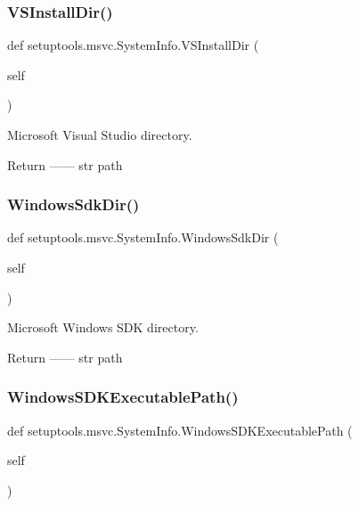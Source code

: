 \subsubsection{\texorpdfstring{V\+S\+Install\+Dir()}{VSInstallDir()}}
{\footnotesize\ttfamily def setuptools.\+msvc.\+System\+Info.\+V\+S\+Install\+Dir (\begin{DoxyParamCaption}\item[{}]{self }\end{DoxyParamCaption})}

\begin{DoxyVerb}Microsoft Visual Studio directory.

Return
------
str
    path
\end{DoxyVerb}
 \mbox{\label{classsetuptools_1_1msvc_1_1SystemInfo_a2aaf265345e0e8438533c8a325b57e7f}} 
\subsubsection{\texorpdfstring{Windows\+Sdk\+Dir()}{WindowsSdkDir()}}
{\footnotesize\ttfamily def setuptools.\+msvc.\+System\+Info.\+Windows\+Sdk\+Dir (\begin{DoxyParamCaption}\item[{}]{self }\end{DoxyParamCaption})}

\begin{DoxyVerb}Microsoft Windows SDK directory.

Return
------
str
    path
\end{DoxyVerb}
 \mbox{\label{classsetuptools_1_1msvc_1_1SystemInfo_a7a8b2e20afb2590c88e26c002bd8a365}} 
\subsubsection{\texorpdfstring{Windows\+S\+D\+K\+Executable\+Path()}{WindowsSDKExecutablePath()}}
{\footnotesize\ttfamily def setuptools.\+msvc.\+System\+Info.\+Windows\+S\+D\+K\+Executable\+Path (\begin{DoxyParamCaption}\item[{}]{self }\end{DoxyParamCaption})}

